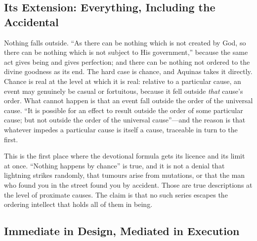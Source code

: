 \subsection{Its Extension: Everything, Including the Accidental}

Nothing falls outside. ``As there can be nothing which is not created by God, so there can be nothing which is not subject to His government,'' because the same act gives being and gives perfection; and there can be nothing not ordered to the divine goodness as its end. The hard case is chance, and Aquinas takes it directly. Chance is real at the level at which it is real: relative to a particular cause, an event may genuinely be casual or fortuitous, because it fell outside \emph{that} cause's order. What cannot happen is that an event fall outside the order of the universal cause. ``It is possible for an effect to result outside the order of some particular cause; but not outside the order of the universal cause''---and the reason is that whatever impedes a particular cause is itself a cause, traceable in turn to the first.

This is the first place where the devotional formula gets its licence and its limit at once. ``Nothing happens by chance'' is true, and it is not a denial that lightning strikes randomly, that tumours arise from mutations, or that the man who found you in the street found you by accident. Those are true descriptions at the level of proximate causes. The claim is that no such series escapes the ordering intellect that holds all of them in being.

\subsection{Immediate in Design, Mediated in Execution}

